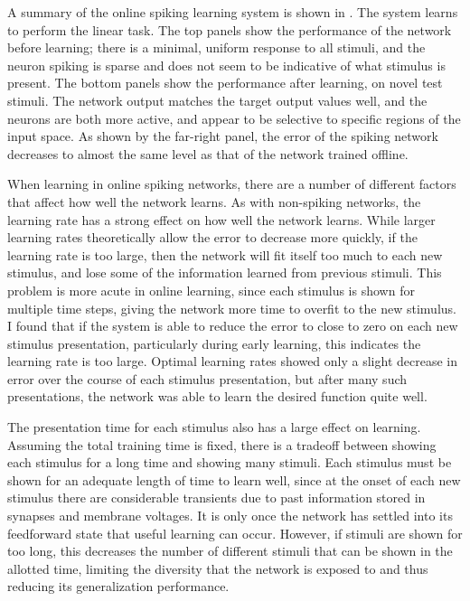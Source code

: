 A summary of the online spiking learning system is shown in .
The system learns to perform the linear task.
The top panels show the performance of the network before learning;
there is a minimal, uniform response to all stimuli,
and the neuron spiking is sparse and does not seem to be indicative
of what stimulus is present.
The bottom panels show the performance after learning, on novel test stimuli.
The network output matches the target output values well,
and the neurons are both more active,
and appear to be selective to specific regions of the input space.
As shown by the far-right panel,
the error of the spiking network
decreases to almost the same level as that of the network trained offline.

When learning in online spiking networks,
there are a number of different factors that affect
how well the network learns.
As with non-spiking networks,
the learning rate has a strong effect on how well the network learns.
While larger learning rates theoretically
allow the error to decrease more quickly,
if the learning rate is too large,
then the network will fit itself too much to each new stimulus,
and lose some of the information learned from previous stimuli.
This problem is more acute in online learning,
since each stimulus is shown for multiple time steps,
giving the network more time to overfit to the new stimulus.
I found that if the system is able to reduce the error to close to zero
on each new stimulus presentation, particularly during early learning,
this indicates the learning rate is too large.
Optimal learning rates showed only a slight decrease in error
over the course of each stimulus presentation,
but after many such presentations,
the network was able to learn the desired function quite well.

The presentation time for each stimulus also has a large effect on learning.
Assuming the total training time is fixed,
there is a tradeoff between showing each stimulus for a long time
and showing many stimuli.
Each stimulus must be shown for an adequate length of time to learn well,
since at the onset of each new stimulus there are considerable transients
due to past information stored in synapses and membrane voltages.
It is only once the network has settled into its feedforward state
that useful learning can occur.
However, if stimuli are shown for too long,
this decreases the number of different stimuli that can be shown
in the allotted time,
limiting the diversity that the network is exposed to and
thus reducing its generalization performance.

